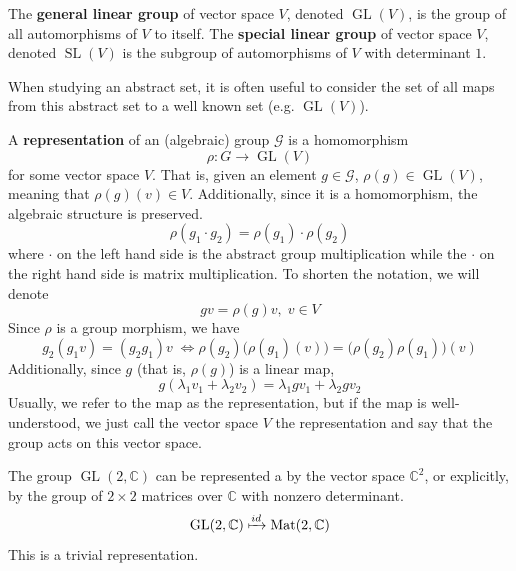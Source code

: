 \documentclass{article}
\DeclareMathOperator{\GL}{GL}
\DeclareMathOperator{\SL}{SL}
\begin{document}
  \begin{definition}
    The \textbf{general linear group} of vector space $V$, denoted $\GL(V)$, is the group of all automorphisms of $V$ to itself. The \textbf{special linear group} of vector space $V$, denoted $\SL(V)$ is the subgroup of automorphisms of $V$ with determinant $1$. 
  \end{definition}

  When studying an abstract set, it is often useful to consider the set of all maps from this abstract set to a well known set (e.g. $\GL(V)$). 

  \begin{definition}
    A \textbf{representation} of an (algebraic) group $\mathcal{G}$ is a homomorphism 
    \begin{equation}
      \rho: G \longrightarrow \GL(V)
    \end{equation}
    for some vector space $V$. That is, given an element $g \in \mathcal{G}$, $\rho(g) \in \GL (V)$, meaning that $\rho(g)(v) \in V$. Additionally, since it is a homomorphism, the algebraic structure is preserved. 
    \begin{equation}
      \rho(g_1 \cdot g_2) = \rho(g_1) \cdot \rho(g_2)
    \end{equation}
    where $\cdot$ on the left hand side is the abstract group multiplication while the $\cdot$ on the right hand side is matrix multiplication. To shorten the notation, we will denote 
    \begin{equation}
      g v = \rho(g) v, \; v \in V
    \end{equation}
    Since $\rho$ is a group morphism, we have 
    \begin{equation}
      g_2 (g_1 v) = (g_2 g_1) v \; \iff \rho(g_2) \big( \rho(g_1) (v) \big) = \big( \rho(g_2) \rho(g_1) \big) (v)
    \end{equation}
    Additionally, since $g$ (that is, $\rho(g)$) is a linear map, 
    \begin{equation}
      g(\lambda_1 v_1 + \lambda_2 v_2) = \lambda_1 g v_1 + \lambda_2 g v_2
    \end{equation}
    Usually, we refer to the map as the representation, but if the map is well-understood, we just call the vector space $V$ the representation and say that the group acts on this vector space. 
  \end{definition}

  \begin{example}
    The group $\GL(2, \mathbb{C})$ can be represented a by the vector space $\mathbb{C}^2$, or explicitly, by the group of $2 \times 2$ matrices over $\mathbb{C}$ with nonzero determinant.
    \begin{equation}
      \GL(2, \mathbb{C}) \xmapsto{id} \text{Mat}(2, \mathbb{C})
    \end{equation}
    This is a trivial representation. 
  \end{example}
\end{document}
